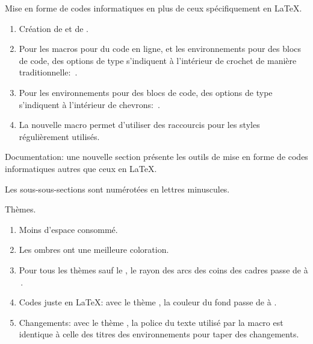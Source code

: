 \begin{tdocnew}
	\item Mise en forme de codes informatiques en plus de ceux spécifiquement en \LaTeX.
	\begin{enumerate}
		\item Création de  et de .

		\item Pour les macros pour du code en ligne, et les environnements pour des blocs de code, des options de type  s'indiquent à l'intérieur de crochet de manière traditionnelle: \,.

		\item Pour les environnements pour des blocs de code, des options de type  s'indiquent à l'intérieur de chevrons: \,.

		\item La nouvelle macro  permet d'utiliser des raccourcis pour les styles  régulièrement utilisés.
	\end{enumerate}

	\item Documentation: une nouvelle section présente les outils de mise en forme de codes informatiques autres que ceux en \LaTeX.
\end{tdocnew}


\begin{tdocupdate}
	\item Les sous-sous-sections sont numérotées en lettres minuscules.

	\item Thèmes.
	\begin{enumerate}
		\item Moins d'espace consommé.

		\item Les ombres ont une meilleure coloration.

		\item Pour tous les thèmes sauf le , le rayon des arcs des coins des cadres passe de \tdoclatexin{.75mm} à \tdoclatexin{.2pt}\,.

 		\item Codes juste en \LaTeX: avec le thème , la couleur du fond passe de  à .

		\item Changements: avec le thème , la police du texte \tdoclatexin{[Init]} utilisé par la macro  est identique à celle des titres des environnements pour taper des changements.
	\end{enumerate}
\end{tdocupdate}

